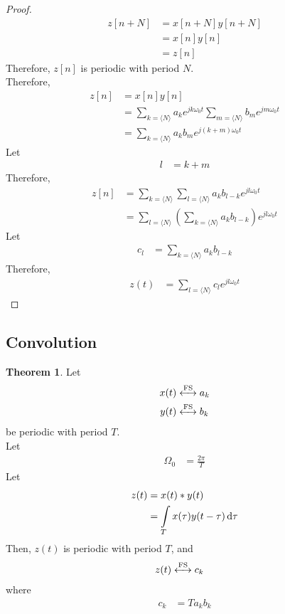 \documentclass[titlepage, fleqn, a4paper, 12pt, twoside]{article}
\theoremstyle{definition}
\theoremstyle{theorem}
\newtheorem{theorem}{Theorem}
\newcommand{\FS}{\xleftrightarrow{\mathrm{FS}}}
\begin{document}
\begin{proof}
	\begin{align*}
		z[n + N] &= x[n + N] y[n + N]\\
		&= x[n] y[n]\\
		&= z[n]
	\end{align*}
	Therefore, $z[n]$ is periodic with period $N$.\\
	Therefore,
	\begin{align*}
		z[n] &= x[n] y[n]\\
		&= \sum\limits_{k = \langle N \rangle} a_k e^{j k \omega_0 t} \sum\limits_{m = \langle N \rangle} b_m e^{j m \omega_0 t}\\
		&= \sum\limits_{k = \langle N \rangle} a_k b_m e^{j (k + m) \omega_0 t}
	\end{align*}
	Let
	\begin{align*}
		l &= k + m
	\end{align*}
	Therefore,
	\begin{align*}
		z[n] &= \sum\limits_{k = \langle N \rangle} \sum\limits_{l = \langle N \rangle} a_k b_{l - k} e^{j l \omega_0 t}\\
		&= \sum\limits_{l = \langle N \rangle} \left( \sum\limits_{k = \langle N \rangle} a_k b_{l - k} \right) e^{j l \omega_0 t}
	\end{align*}
	Let
	\begin{align*}
		c_l &= \sum\limits_{k = \langle N \rangle} a_k b_{l - k}
	\end{align*}
	Therefore,
	\begin{align*}
		z(t) &= \sum\limits_{l = \langle N \rangle} c_l e^{j l \omega_0 t}
	\end{align*}
\end{proof}

\subsection{Convolution}

\begin{theorem}
	Let
	\begin{align*}
		x(t) &\FS a_k\\
		y(t) &\FS b_k
	\end{align*}
	be periodic with period $T$.\\
	Let
	\begin{align*}
		\Omega_0 &= \frac{2 \pi}{T}
	\end{align*}
	Let
	\begin{align*}
		z(t) &= x(t) \ast y(t)\\
		&= \int\limits_{T} x(\tau) y(t - \tau) \dif \tau
	\end{align*}
	Then, $z(t)$ is periodic with period $T$, and
	\begin{align*}
		z(t) &\FS c_k
	\end{align*}
	where
	\begin{align*}
		c_k &= T a_k b_k
	\end{align*}
\end{theorem}
\end{document}
